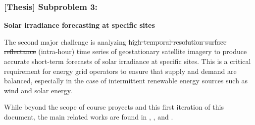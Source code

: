 \subsubsection{[Thesis] Subproblem 3:} 
    \textbf{Solar irradiance forecasting at specific sites} 

    The second major challenge is analyzing \st{high-temporal-resolution surface reflectance} (intra-hour) time series of geostationary satellite imagery to produce accurate short-term forecasts of solar irradiance at specific sites. 
    This is a critical requirement for energy grid operators to ensure that supply and demand are balanced, especially in the case of intermittent renewable energy sources such as wind and solar energy. 

    While beyond the scope of course proyects and this first iteration of this document, the main related works are found in \cite{Bansal_ssl_nowcasting_2022}, \cite{Li_solarcube_solar_forecasting_2024}, and \cite{Boussif_neurips_day_ahead_solar_forecasting_2023}. 

    
        
    

    \hfill
